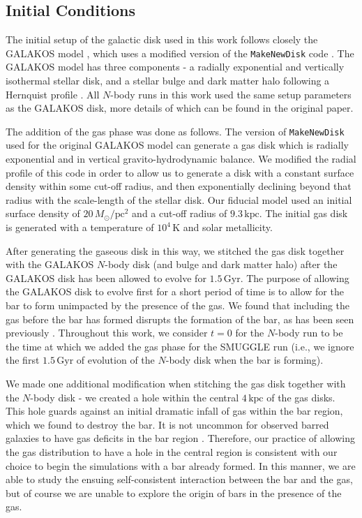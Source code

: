 \documentclass[twocolumn,linenumbers,trackchanges]{aastex631}
\newcommand{\Nbody}{$N$-body}
\newcommand{\SMUGGLE}{SMUGGLE}
\begin{document}
\subsection{Initial Conditions}
The initial setup of the galactic disk used in this work follows closely the
GALAKOS model \citep{2020ApJ...890..117D}, which uses a modified version of the
\texttt{MakeNewDisk} code \citep{2005MNRAS.361..776S}. The GALAKOS model has
three components - a radially exponential and vertically isothermal stellar
disk, and a stellar bulge and dark matter halo following a Hernquist profile
\citep{1990ApJ...356..359H}. All \Nbody{} runs in this work used the same setup
parameters as the GALAKOS disk, more details of which can be found in the
original paper.

The addition of the gas phase was done as follows. The version of
\texttt{MakeNewDisk} used for the original GALAKOS model can generate a gas disk
which is radially exponential and in vertical gravito-hydrodynamic balance. We
modified the radial profile of this code in order to allow us to generate a disk
with a constant surface density within some cut-off radius, and then
exponentially declining beyond that radius with the scale-length of the stellar
disk. Our fiducial model used an initial surface density of
$20\,M_{\odot}/\textrm{pc}^2$ and a cut-off radius of $9.3\,\textrm{kpc}$. The
initial gas disk is generated with a temperature of $10^4\,\textrm{K}$ and solar
metallicity.

After generating the gaseous disk in this way, we stitched the gas disk together
with the GALAKOS \Nbody{} disk (and bulge and dark matter halo) after the
GALAKOS disk has been allowed to evolve for $1.5\,\textrm{Gyr}$. The purpose of
allowing the GALAKOS disk to evolve first for a short period of time is to allow
for the bar to form unimpacted by the presence of the gas. We found that
including the gas before the bar has formed disrupts the formation of the bar,
as has been seen previously \citep[e.g.,][]{2013MNRAS.429.1949A}. Throughout
this work, we consider $t=0$ for the \Nbody{} run to be the time at which we
added the gas phase for the \SMUGGLE{} run (i.e., we ignore the first
$1.5\,\textrm{Gyr}$ of evolution of the \Nbody{} disk when the bar is forming).

We made one additional modification when stitching the gas disk together with
the \Nbody{} disk - we created a hole within the central $4\,\textrm{kpc}$ of
the gas disks. This hole guards against an initial dramatic infall of gas within
the bar region, which we found to destroy the bar. It is not uncommon for
observed barred galaxies to have gas deficits in the bar region \citep[though
not in the very center;][]{1993RPPh...56..173S}. Therefore, our practice of
allowing the gas distribution to have a hole in the central region is consistent
with our choice to begin the simulations with a bar already formed. In this
manner, we are able to study the ensuing self-consistent interaction between the
bar and the gas, but of course we are unable to explore the origin of bars in
the presence of the gas.
\end{document}
